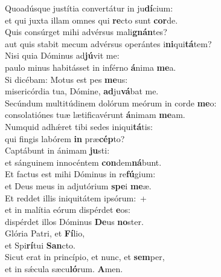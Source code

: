 \oddverse Quoadúsque justítia convertátur in ju\textbf{dí}cium:~\*\\
\oddverse et qui juxta illam omnes qui \textbf{re}cto sunt \textbf{cor}de.\\
\evenverse Quis consúrget mihi advérsus mali\textbf{gnán}tes?~\*\\
\evenverse aut quis stabit mecum advérsus operántes i\textbf{ni}qui\textbf{tá}tem?\\
\oddverse Nisi quia Dóminus ad\textbf{jú}vit me:~\*\\
\oddverse paulo minus habitásset in inférno \textbf{á}nima \textbf{me}a.\\
\evenverse Si dicébam: Motus est pes \textbf{me}us:~\*\\
\evenverse misericórdia tua, Dómine, \textbf{ad}ju\textbf{vá}bat me.\\
\oddverse Secúndum multitúdinem dolórum meórum in corde \textbf{me}o:~\*\\
\oddverse consolatiónes tuæ lætificavérunt \textbf{á}nimam \textbf{me}am.\\
\evenverse Numquid adhǽret tibi sedes iniqui\textbf{tá}tis:~\*\\
\evenverse qui fingis labórem \textbf{in} præ\textbf{cép}to?\\
\oddverse Captábunt in ánimam \textbf{ju}sti:~\*\\
\oddverse et sánguinem innocéntem \textbf{con}dem\textbf{ná}bunt.\\
\evenverse Et factus est mihi Dóminus in re\textbf{fú}gium:~\*\\
\evenverse et Deus meus in adjutórium \textbf{spe}i \textbf{me}æ.\\
\oddverse Et reddet illis iniquitátem ipsórum:~+\\
\oddverse  et in malítia eórum dispérdet \textbf{e}os:~\*\\
\oddverse dispérdet illos Dóminus \textbf{De}us \textbf{no}ster.\\
\evenverse Glória Patri, et \textbf{Fí}lio,~\*\\
\evenverse et Spi\textbf{rí}tui \textbf{San}cto.\\
\oddverse Sicut erat in princípio, et nunc, et \textbf{sem}per,~\*\\
\oddverse et in sǽcula sæcu\textbf{ló}rum. \textbf{A}men.\\
